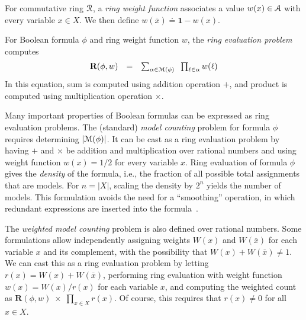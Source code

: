 \documentclass[letterpaper,USenglish,cleveref, autoref, thm-restate]{lipics-v2021}
\newcommand{\obar}[1]{\overline{#1}}
\newcommand{\lit}{\ell}
\newcommand{\varset}{X}
\newcommand{\ring}{{\cal R}}
\newcommand{\dset}{{\cal A}}
\newcommand{\rep}{\textbf{R}}
\newcommand{\radd}{+}
\newcommand{\rmul}{\times}
\newcommand{\mulident}{\textbf{1}}
\newcommand{\modelset}{{\cal M}}
\begin{document}
\begin{definition}
\label{def:ring_evaluation}
  For commutative ring $\ring$, a \emph{ring weight function} associates a value $w(x) \in \dset$ with
  every variable $x \in \varset$.  We then define $w(\obar{x}) \doteq \mulident-w(x)$.

  For Boolean formula $\phi$ and ring weight function $w$, the \emph{ring evaluation problem} computes
  \begin{equation}
    \begin{array}{rcl}
    \rep(\phi, w) & = & \sum_{\alpha \in \modelset(\phi)} \;\; \prod_{\lit \in \alpha} w(\ell) \label{eqn:rep}
    \end{array}
  \end{equation}
  In this equation, sum \scalebox{0.8}{$\sum$} is computed using addition operation $\radd$, and product \scalebox{0.8}{$\prod$} is computed using multiplication operation $\rmul$.
\label{def:weight}
\end{definition}

Many important properties of Boolean formulas can be
expressed as ring evaluation problems.  The
(standard) \emph{model counting} problem for formula $\phi$ requires determining $|\modelset(\phi)|$.
It can be cast as a ring evaluation problem by having $\radd$ and
$\rmul$ be addition and multiplication over rational numbers and using
weight function $w(x) = 1/2$ for every variable $x$.
Ring evaluation of formula $\phi$ gives the \emph{density} of
the formula, i.e., the fraction of all possible total assignments that are
models.  For $n = |\varset|$, scaling the density by $2^n$
yields the number of models.  This formulation avoids the need for a ``smoothing'' operation,
in which redundant expressions are inserted into the formula~\cite{darwiche:jair:2002}.

The \emph{weighted model counting}  problem is also defined over
rational numbers.  Some formulations  allow
independently assigning weights $W(x)$ and $W(\obar{x})$ for each variable $x$ and its complement, with the possibility that
$W(x) + W(\obar{x}) \not = 1$.
We can cast this as a
ring evaluation problem by letting $r(x) = W(x) + W(\obar{x})$,
performing ring evaluation with weight function $w(x) = W(x)/r(x)$ for each
variable $x$, and computing the weighted count
as $\rep(\phi, w)\; \rmul\; \prod_{x \in \varset} r(x)$.
Of course, this requires that $r(x) \not = 0$ for all $x \in \varset$.
\end{document}
